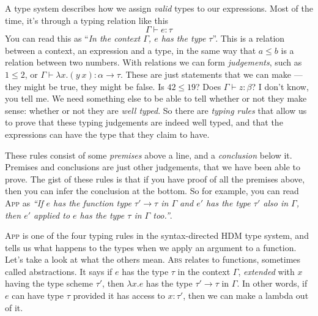 A type system describes how we assign \emph{valid} types to our
expressions. Most of the time, it's through a typing relation like this
\[ \Gamma \vdash e : \tau \]
You can read this as ``\textit{In the context
  $\Gamma$, $e$ has the type $\tau$}''. This is a relation between a context,
an expression and a type, in the same way that $a \leq b$ is a relation
between two numbers. With relations we can form \textit{judgements},
such as ${1 \leq 2}$, or
${\Gamma \vdash \lambda x . (y \ x) : \alpha \rightarrow \tau}$.  These are just statements that we can
make --- they might be true, they might be false. Is $42 \leq 19$? Does
${\Gamma \vdash z : \beta}$? I don't know, you tell me. We need something else to be
able to tell whether or not they make sense: whether or not they are
\textit{well typed}. So there are \emph{typing rules} that allow us to
prove that these typing judgements are indeed well typed, and that the
expressions can have the type that they claim to have.
These rules consist of some \emph{premises} above a line, and a
\emph{conclusion} below it. Premises and conclusions are just other
judgements, that we have been able to prove.
The gist of these rules is that if you have proof of all the premises
above, then you can infer the conclusion at the bottom. So for example, you
can read \textsc{App} as \textsl{``If $e$ has the function type $\tau' \rightarrow \tau$
  in $\Gamma$ and $e'$ has the type $\tau'$ also in $\Gamma$, then $e'$ applied to
  $e$ has the type $\tau$ in $\Gamma$ too.''}.

\textsc{App} is one of the four typing rules in the syntax-directed
HDM type system, and tells us what happens to the types when we apply
an argument to a function. Let's take a look at what the others mean.
\textsc{Abs} relates to functions, sometimes called abstractions. It
says if $e$ has the type $\tau$ in the context $\Gamma$, \textit{extended}
with $x$ having the type scheme $\tau'$, then $\lambda x.e$ has the type ${\tau' \rightarrow
\tau}$ in $\Gamma$. In other words, if $e$ can have type $\tau$ provided it has
access to $x : \tau'$, then we can make a lambda out of it.

